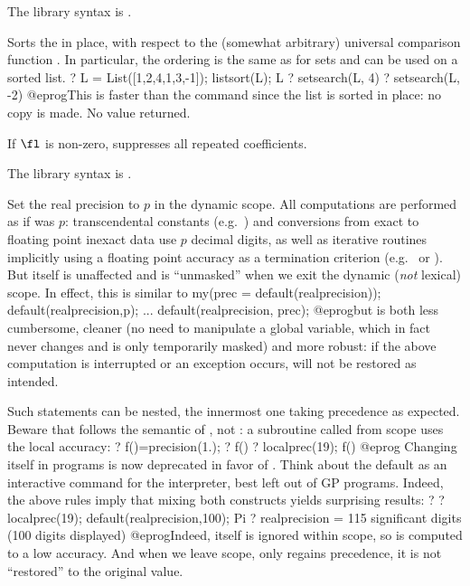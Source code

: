 The library syntax is .

\label{se:listsort}
Sorts the   in place, with respect to the (somewhat
arbitrary) universal comparison function . In particular, the
ordering is the same as for sets and  can be used on a sorted
list.
\bprog
? L = List([1,2,4,1,3,-1]); listsort(L); L
? setsearch(L, 4)
? setsearch(L, -2)
@eprog\noindent This is faster than the  command since the list
is sorted in place: no copy is made. No value returned.

If $\fl$ is non-zero, suppresses all repeated coefficients.

The library syntax is .

\label{se:localprec}
Set the real precision to $p$ in the dynamic scope. All computations
are performed as if  was $p$:
transcendental constants (e.g.~) and
conversions from exact to floating point inexact data use $p$ decimal
digits, as well as iterative routines implicitly using a floating point
accuracy as a termination criterion (e.g.~ or ).
But  itself is unaffected
and is ``unmasked'' when we exit the dynamic (\emph{not} lexical) scope.
In effect, this is similar to
\bprog
my(prec = default(realprecision));
default(realprecision,p);
...
default(realprecision, prec);
@eprog\noindent but is both less cumbersome, cleaner (no need to manipulate
a global variable, which in fact never changes and is only temporarily masked)
and more robust: if the above computation is interrupted or an exception
occurs,  will not be restored as intended.

Such  statements can be nested, the innermost one taking
precedence as expected. Beware that  follows the semantic of
, not : a subroutine called from  scope
uses the local accuracy:
\bprog
? f()=precision(1.);
? f()
? localprec(19); f()
@eprog\noindent
{} Changing  itself in programs is
now deprecated in favor of . Think about the
 default as an interactive command for the 
interpreter, best left out of GP programs. Indeed, the above rules
imply that mixing both constructs yields surprising results:
\bprog
? 
? localprec(19); default(realprecision,100);  Pi
? \p
    realprecision = 115 significant digits (100 digits displayed)
@eprog\noindent Indeed,  itself is ignored within
 scope, so  is computed to a low accuracy. And when
we leave  scope,  only regains precedence,
it is not ``restored'' to the original value.

